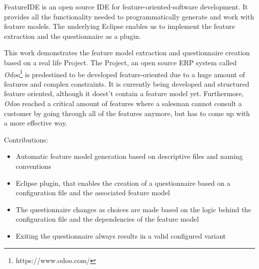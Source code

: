 FeatureIDE is an open source IDE for feature-oriented-software development. It provides all the functionality needed to programmatically generate and work with feature models.
 The underlying Eclipse enables us to implement the feature extraction and the questionnaire as a plugin.

This work demonstrates the feature model extraction and questionnaire creation based on a real life Project. The Project, an open source ERP system called \textit{Odoo}\footnote{https://www.odoo.com/} is predestined to be developed feature-oriented due to a huge amount of features and complex constraints. It is currently being developed and structured feature oriented, although it doest't contain a feature model yet. Furthermore, \textit{Odoo} reached a critical amount of features where a salesman cannot consult a customer by going through all of the features anymore, but has to come up with a more effective way.

Contributions:
\begin{itemize}
\item Automatic feature model generation based on descriptive files and naming conventions
\item Eclipse plugin, that enables the creation of a questionnaire based on a configuration file and the associated feature model
\item The questionnaire changes as choices are made based on the logic behind the configuration file and the dependencies of the feature model
\item Exiting the questionnaire always results in a valid configured variant 
\end{itemize}